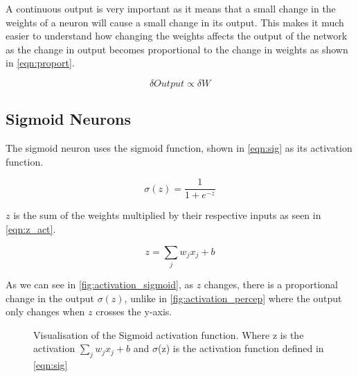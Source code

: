 A continuous output is very important as it means that a small change in the weights of a neuron will cause a small change in its output. This makes it much easier to understand how changing the weights affects the output of the network as the change in output becomes proportional to the change in weights as shown in \autoref{eqn:proport}.

\begin{equation} \label{eqn:proport}
	\delta Output \propto \delta W	
\end{equation}  


\subsection{Sigmoid Neurons}

The sigmoid neuron uses the sigmoid function, shown in \autoref{eqn:sig} as its activation function. 

\begin{equation} \label{eqn:sig}
\sigma(z) = \frac{1}{1 + e^{-z}}
\end{equation}

$z$ is the sum of the weights multiplied by their respective inputs as seen in  \autoref{eqn:z_act}.

\begin{equation} \label{eqn:z_act}
z = \sum_{j} w_j x_j + b
\end{equation}

As we can see in \autoref{fig:activation_sigmoid}, as $z$ changes, there is a proportional change in the output $\sigma(z)$, unlike in \autoref{fig:activation_percep} where the output only changes when $z$ crosses the y-axis.

\begin{figure}
\begin{center}
\caption{Visualisation of the Sigmoid activation function. Where z is the activation $\sum_{j} w_j x_j + b$ and $\sigma$(z) is the activation function defined in \autoref{eqn:sig} }
\label{fig:activation_sigmoid}
\end{center}
\end{figure}

